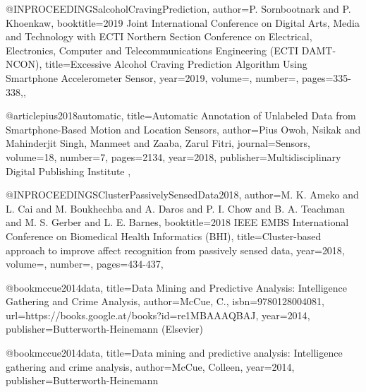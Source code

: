 @INPROCEEDINGS{alcoholCravingPrediction,  
author={P. {Sornbootnark} and P. {Khoenkaw}},  
booktitle={2019 Joint International Conference on Digital Arts, Media and Technology with ECTI Northern Section Conference on Electrical, Electronics, Computer and Telecommunications Engineering (ECTI DAMT-NCON)},  
title={Excessive Alcohol Craving Prediction Algorithm Using Smartphone Accelerometer Sensor},   
year={2019},  
volume={},  
number={},  
pages={335-338},},

@article{pius2018automatic,
  title={Automatic Annotation of Unlabeled Data from Smartphone-Based Motion and Location Sensors},
  author={Pius Owoh, Nsikak and Mahinderjit Singh, Manmeet and Zaaba, Zarul Fitri},
  journal={Sensors},
  volume={18},
  number={7},
  pages={2134},
  year={2018},
  publisher={Multidisciplinary Digital Publishing Institute}
},

@INPROCEEDINGS{ClusterPassivelySensedData2018,  
author={M. K. {Ameko} and L. {Cai} and M. {Boukhechba} and A. {Daros} and P. I. {Chow} and B. A. {Teachman} and M. S. {Gerber} and L. E. {Barnes}},  
booktitle={2018 IEEE EMBS International Conference on Biomedical   Health Informatics (BHI)},  
title={Cluster-based approach to improve affect recognition from passively sensed data},   
year={2018},  
volume={},  
number={},  
pages={434-437},}


@book{mccue2014data,
  title={Data Mining and Predictive Analysis: Intelligence Gathering and Crime Analysis},
  author={McCue, C.},
  isbn={9780128004081},
  url={https://books.google.at/books?id=re1MBAAAQBAJ},
  year={2014},
  publisher={Butterworth-Heinemann (Elsevier)}
}


@book{mccue2014data,
  title={Data mining and predictive analysis: Intelligence gathering and crime analysis},
  author={McCue, Colleen},
  year={2014},
  publisher={Butterworth-Heinemann}
}